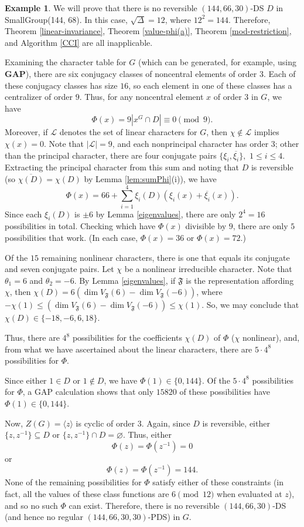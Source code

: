 \documentclass[12pt]{amsproc} %
\theoremstyle{definition}\newtheorem{defn}[thm]{Definition}
\theoremstyle{definition}\newtheorem{rem}[thm]{Remark}
\theoremstyle{definition}\newtheorem{ex}[thm]{Example}
\newcommand{\GAP}{\textbf{{\rm GAP}}}
\renewcommand\le{\leqslant}
\newcommand{\repF}{\mathfrak{F}}
\begin{document}
\begin{ex}\label{no-Hadamard-DS}
	We will prove that there is no reversible $(144, 66, 30)$-DS $D$ in SmallGroup(144, 68). In this case, $\sqrt\Delta = 12$, where $12^2 = 144$. Therefore, Theorem \ref{linear-invariance}, Theorem \ref{value-phi(a)}, Theorem \ref{mod-restriction}, and Algorithm \ref{CCI} are all inapplicable.
	
	 Examining the character table for $G$ (which can be generated, for example, using \GAP \cite{GAP4}), there are six conjugacy classes of noncentral elements of order $3$. Each of these conjugacy classes has size $16$, so each element in one of these classes has a centralizer of order $9$. Thus, for any noncentral element $x$ of order $3$ in $G$, we have
		\[ \Phi(x) = 9 |x^G \cap D| \equiv 0 \pmod 9.\]
	Moreover, if $\mathcal{L}$ denotes the set of linear characters for $G$, then $\chi \notin \mathcal{L}$ implies $\chi(x) = 0$. Note that $|\mathcal{L}| = 9$, and each nonprincipal character has order $3$; other than the principal character, there are four conjugate pairs $\{\xi_i, \overline{\xi_i}\},$ $1 \le i \le 4$. Extracting the principal character from this sum and noting that $D$ is reversible (so $\overline{\chi(D)} = \chi(D)$ by Lemma \ref{lem:sumPhi}(i)), we have
		\[ \Phi(x) = 66 + \sum_{i = 1}^4 \xi_i(D) (\xi_i(x) + \overline{\xi_i}(x)).\]
	Since each $\xi_i(D)$ is $\pm 6$ by Lemma \ref{eigenvalues}, there are only $2^4 = 16$ possibilities in total. Checking which have $\Phi(x)$ divisible by $9$, there are only $5$ possibilities that work. (In each case, $\Phi(x) = 36$ or $\Phi(x) = 72$.)

	Of the $15$ remaining nonlinear characters, there is one that equals its conjugate and seven conjugate pairs. Let $\chi$ be a nonlinear irreducible character. Note that $\theta_1 = 6$ and $\theta_2 = -6$. By Lemma \ref{eigenvalues}, if $\repF$ is the representation affording $\chi$, then $\chi(D) = 6 (\dim V_\repF(6) - \dim V_\repF(-6))$, where $-\chi(1) \le (\dim V_\repF(6) - \dim V_\repF(-6)) \le \chi(1)$. So, we may conclude that $\chi(D) \in \{-18, -6, 6, 18\}$.

	Thus, there are $4^8$ possibilities for the coefficients $\chi(D)$ of $\Phi$ ($\chi$ nonlinear), and, from what we have ascertained about the linear characters, there are $5\cdot 4^8$ possibilities for $\Phi$.

	Since either $1 \in D$ or $1 \notin D$, we have $\Phi(1) \in \{0, 144\}$. Of the $5 \cdot 4^8$ possibilities for $\Phi$, a GAP \cite{GAP4} calculation shows that only $15820$ of these possibilities have $\Phi(1) \in \{0, 144\}$.

	Now, $Z(G) = \langle z \rangle$ is cyclic of order $3$. Again, since $D$ is reversible, either $\{z, z^{-1}\} \subseteq D$ or $\{z, z^{-1}\} \cap D = \varnothing$. Thus, either
		\[ \Phi(z) = \Phi(z^{-1}) = 0\]
	or
		\[ \Phi(z) = \Phi(z^{-1}) = 144.\]
	None of the remaining possibilities for $\Phi$ satisfy either of these constraints (in fact, all the values of these class functions are $6 \pmod {12}$ when evaluated at $z$), and so no such $\Phi$ can exist. Therefore, there is no reversible $(144,66,30)$-DS (and hence no regular $(144,66,30,30)$-PDS) in $G$.
	\end{ex}
\end{document}
